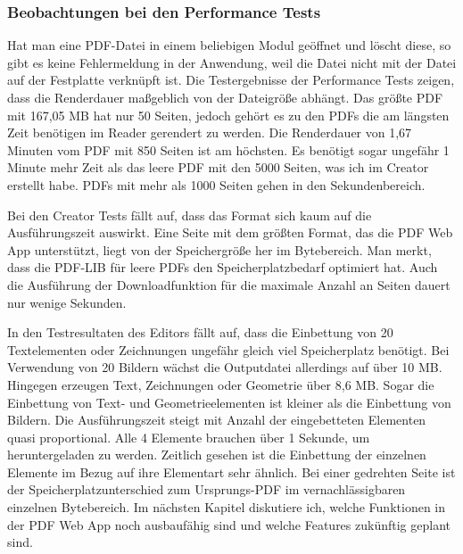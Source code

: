 \subsubsection{Beobachtungen bei den Performance Tests}
Hat man eine PDF-Datei in einem beliebigen Modul geöffnet und löscht diese, so gibt es keine Fehlermeldung in der Anwendung, weil die Datei nicht mit der Datei auf der Festplatte verknüpft ist. Die Testergebnisse der Performance Tests zeigen, dass die Renderdauer maßgeblich von der Dateigröße abhängt. Das größte PDF mit 167,05 MB hat nur 50 Seiten, jedoch gehört es zu den PDFs die am längsten Zeit benötigen im Reader gerendert zu werden. Die Renderdauer von 1,67 Minuten vom PDF mit 850 Seiten ist am höchsten. Es benötigt sogar ungefähr 1 Minute mehr Zeit als das leere PDF mit den 5000 Seiten, was ich im Creator erstellt habe. PDFs mit mehr als 1000 Seiten gehen in den Sekundenbereich.
\par 
Bei den Creator Tests fällt auf, dass das Format sich kaum auf die Ausführungszeit auswirkt. Eine Seite mit dem größten Format, das die PDF Web App unterstützt, liegt von der Speichergröße her im Bytebereich. Man merkt, dass die PDF-LIB für leere PDFs den Speicherplatzbedarf optimiert hat. Auch die Ausführung der Downloadfunktion für die maximale Anzahl an Seiten dauert nur wenige Sekunden. 
\par
In den Testresultaten des Editors fällt auf, dass die Einbettung von 20 Textelementen oder Zeichnungen ungefähr gleich viel Speicherplatz benötigt. Bei Verwendung von 20 Bildern wächst die Outputdatei allerdings auf über 10 MB. Hingegen erzeugen Text, Zeichnungen oder Geometrie über 8,6 MB. Sogar die Einbettung von Text- und Geometrieelementen ist kleiner als die Einbettung von Bildern. Die Ausführungszeit steigt mit Anzahl der eingebetteten Elementen quasi proportional. Alle 4 Elemente brauchen über 1 Sekunde, um heruntergeladen zu werden. Zeitlich gesehen ist die Einbettung der einzelnen Elemente im Bezug auf ihre Elementart sehr ähnlich. Bei einer gedrehten Seite ist der Speicherplatzunterschied zum Ursprungs-PDF im vernachlässigbaren einzelnen Bytebereich. Im nächsten Kapitel diskutiere ich, welche Funktionen in der PDF Web App noch ausbaufähig sind und welche Features zukünftig geplant sind.